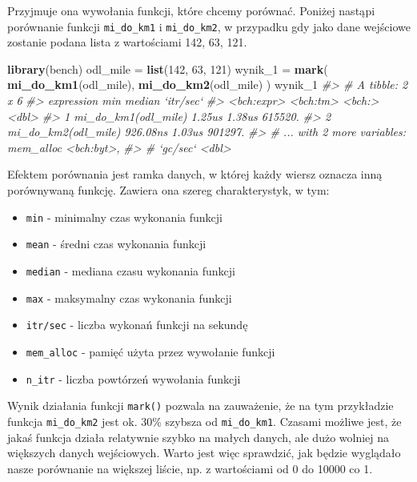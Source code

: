 \documentclass[paper=6in:9in,pagesize=pdftex,headinclude=on,footinclude=on,10pt]{scrbook}
\newenvironment{Shaded}{\begin{snugshade}}{\end{snugshade}}
\newcommand{\CommentTok}[1]{\textcolor[rgb]{0.56,0.35,0.01}{\textit{#1}}}
\newcommand{\DecValTok}[1]{\textcolor[rgb]{0.00,0.00,0.81}{#1}}
\newcommand{\KeywordTok}[1]{\textcolor[rgb]{0.13,0.29,0.53}{\textbf{#1}}}
\newcommand{\NormalTok}[1]{#1}
\newcommand{\StringTok}[1]{\textcolor[rgb]{0.31,0.60,0.02}{#1}}
\providecommand{\tightlist}{%
  \setlength{\itemsep}{0pt}\setlength{\parskip}{0pt}}
\begin{document}
Przyjmuje ona wywołania funkcji, które chcemy porównać.
Poniżej nastąpi porównanie funkcji \texttt{mi\_do\_km1} i \texttt{mi\_do\_km2}, w przypadku gdy jako dane wejściowe zostanie podana lista z wartościami 142, 63, 121.

\begin{Shaded}
\begin{Highlighting}[]
\KeywordTok{library}\NormalTok{(bench)}
\NormalTok{odl_mile =}\StringTok{ }\KeywordTok{list}\NormalTok{(}\DecValTok{142}\NormalTok{, }\DecValTok{63}\NormalTok{, }\DecValTok{121}\NormalTok{)}
\NormalTok{wynik_}\DecValTok{1}\NormalTok{ =}\StringTok{ }\KeywordTok{mark}\NormalTok{(}
  \KeywordTok{mi_do_km1}\NormalTok{(odl_mile),}
  \KeywordTok{mi_do_km2}\NormalTok{(odl_mile)}
\NormalTok{)}
\NormalTok{wynik_}\DecValTok{1}
\CommentTok{#> # A tibble: 2 x 6}
\CommentTok{#>   expression               min median `itr/sec`}
\CommentTok{#>   <bch:expr>          <bch:tm> <bch:>     <dbl>}
\CommentTok{#> 1 mi_do_km1(odl_mile)   1.25us 1.38us   615520.}
\CommentTok{#> 2 mi_do_km2(odl_mile) 926.08ns 1.03us   901297.}
\CommentTok{#> # ... with 2 more variables: mem_alloc <bch:byt>,}
\CommentTok{#> #   `gc/sec` <dbl>}
\end{Highlighting}
\end{Shaded}

Efektem porównania jest ramka danych, w której każdy wiersz oznacza inną porównywaną funkcję.
Zawiera ona szereg charakterystyk, w tym:

\begin{itemize}
\tightlist
\item
  \texttt{min} - minimalny czas wykonania funkcji
\item
  \texttt{mean} - średni czas wykonania funkcji
\item
  \texttt{median} - mediana czasu wykonania funkcji
\item
  \texttt{max} - maksymalny czas wykonania funkcji
\item
  \texttt{itr/sec} - liczba wykonań funkcji na sekundę
\item
  \texttt{mem\_alloc} - pamięć użyta przez wywołanie funkcji
\item
  \texttt{n\_itr} - liczba powtórzeń wywołania funkcji
\end{itemize}

Wynik działania funkcji \texttt{mark()} pozwala na zauważenie, że na tym przykładzie funkcja \texttt{mi\_do\_km2} jest ok. 30\% szybsza od \texttt{mi\_do\_km1}.
Czasami możliwe jest, że jakaś funkcja działa relatywnie szybko na małych danych, ale dużo wolniej na większych danych wejściowych.
Warto jest więc sprawdzić, jak będzie wyglądało nasze porównanie na większej liście, np. z wartościami od 0 do 10000 co 1.
\end{document}

